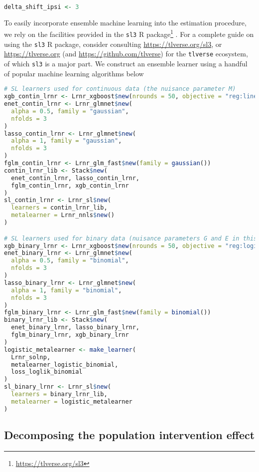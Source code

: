 \documentclass[
  12pt,
]{book}
\newcommand{\passthrough}[1]{#1}
\renewcommand{\href}[2]{#2\footnote{\url{#1}}}
\theoremstyle{definition}
\theoremstyle{definition}
\theoremstyle{definition}
\newcommand{\1}{\mathbbm{1}}
\begin{document}
\begin{lstlisting}[language=R]
delta_shift_ipsi <- 3
\end{lstlisting}

To easily incorporate ensemble machine learning into the estimation procedure,
we rely on the facilities provided in the \href{https://tlverse.org/sl3}{\passthrough{\lstinline!sl3!} R
package} \citep{coyle2020sl3}. For a complete guide on using
the \passthrough{\lstinline!sl3!} R package, consider consulting \url{https://tlverse.org/sl3}, or
\url{https://tlverse.org} (and \url{https://github.com/tlverse}) for the \passthrough{\lstinline!tlverse!}
ecosystem, of which \passthrough{\lstinline!sl3!} is a major part. We construct an ensemble learner
using a handful of popular machine learning algorithms below

\begin{lstlisting}[language=R]
# SL learners used for continuous data (the nuisance parameter M)
xgb_contin_lrnr <- Lrnr_xgboost$new(nrounds = 50, objective = "reg:linear")
enet_contin_lrnr <- Lrnr_glmnet$new(
  alpha = 0.5, family = "gaussian",
  nfolds = 3
)
lasso_contin_lrnr <- Lrnr_glmnet$new(
  alpha = 1, family = "gaussian",
  nfolds = 3
)
fglm_contin_lrnr <- Lrnr_glm_fast$new(family = gaussian())
contin_lrnr_lib <- Stack$new(
  enet_contin_lrnr, lasso_contin_lrnr,
  fglm_contin_lrnr, xgb_contin_lrnr
)
sl_contin_lrnr <- Lrnr_sl$new(
  learners = contin_lrnr_lib,
  metalearner = Lrnr_nnls$new()
)

# SL learners used for binary data (nuisance parameters G and E in this case)
xgb_binary_lrnr <- Lrnr_xgboost$new(nrounds = 50, objective = "reg:logistic")
enet_binary_lrnr <- Lrnr_glmnet$new(
  alpha = 0.5, family = "binomial",
  nfolds = 3
)
lasso_binary_lrnr <- Lrnr_glmnet$new(
  alpha = 1, family = "binomial",
  nfolds = 3
)
fglm_binary_lrnr <- Lrnr_glm_fast$new(family = binomial())
binary_lrnr_lib <- Stack$new(
  enet_binary_lrnr, lasso_binary_lrnr,
  fglm_binary_lrnr, xgb_binary_lrnr
)
logistic_metalearner <- make_learner(
  Lrnr_solnp,
  metalearner_logistic_binomial,
  loss_loglik_binomial
)
sl_binary_lrnr <- Lrnr_sl$new(
  learners = binary_lrnr_lib,
  metalearner = logistic_metalearner
)
\end{lstlisting}

\hypertarget{decomposing-the-population-intervention-effect}{%
\subsection{Decomposing the population intervention effect}\label{decomposing-the-population-intervention-effect}}
\end{document}
